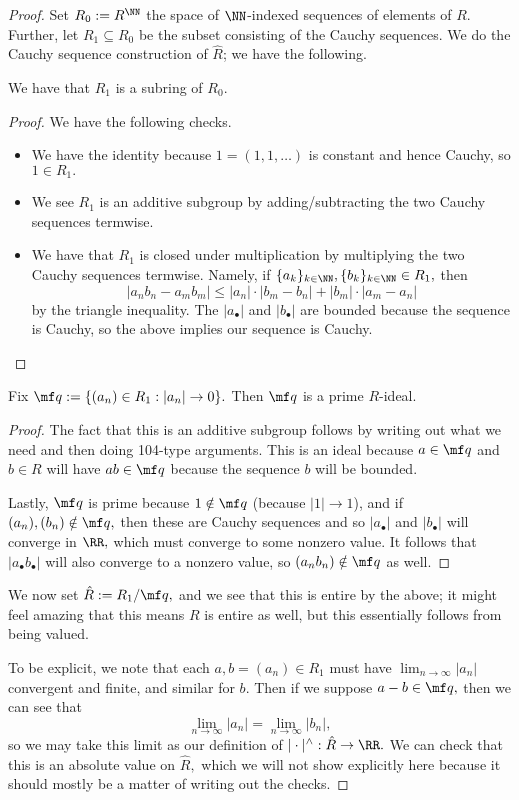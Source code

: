 \begin{proof}
	Set $R_0:=R^\NN$ the space of $\NN$-indexed sequences of elements of $R.$ Further, let $R_1\subseteq R_0$ be the subset consisting of the Cauchy sequences. We do the Cauchy sequence construction of $\hat R$; we have the following.
	\begin{lemma}
		We have that $R_1$ is a subring of $R_0.$
	\end{lemma}
	\begin{proof}
		We have the following checks.
		\begin{itemize}
			\item We have the identity because $1=(1,1,\ldots)$ is constant and hence Cauchy, so $1\in R_1.$
			\item We see $R_1$ is an additive subgroup by adding/subtracting the two Cauchy sequences termwise.
			\item We have that $R_1$ is closed under multiplication by multiplying the two Cauchy sequences termwise. Namely, if $\{a_k\}_{k\in\NN},\{b_k\}_{k\in\NN}\in R_1,$ then
			\[|a_nb_n-a_mb_m|\le|a_n|\cdot|b_m-b_n|+|b_m|\cdot|a_m-a_n|\]
			by the triangle inequality. The $|a_\bullet|$ and $|b_\bullet|$ are bounded because the sequence is Cauchy, so the above implies our sequence is Cauchy.
			\qedhere
		\end{itemize}
	\end{proof}
	\begin{lemma}
		Fix $\mf q:=\{(a_n)\in R_1:|a_n|\to0\}.$ Then $\mf q$ is a prime $R$-ideal.
	\end{lemma}
	\begin{proof}
		The fact that this is an additive subgroup follows by writing out what we need and then doing 104-type arguments. This is an ideal because $a\in\mf q$ and $b\in R$ will have $ab\in\mf q$ because the sequence $b$ will be bounded.
		
		Lastly, $\mf q$ is prime because $1\notin\mf q$ (because $|1|\to1$), and if $(a_n),(b_n)\notin\mf q,$ then these are Cauchy sequences and so $|a_\bullet|$ and $|b_\bullet|$ will converge in $\RR,$ which must converge to some nonzero value. It follows that $|a_\bullet b_\bullet|$ will also converge to a nonzero value, so $(a_nb_n)\notin\mf q$ as well.
	\end{proof}
	We now set $\hat R:=R_1/\mf q,$ and we see that this is entire by the above; it might feel amazing that this means $R$ is entire as well, but this essentially follows from being valued.

	To be explicit, we note that each $a,b=(a_n)\in R_1$ must have $\lim_{n\to\infty}|a_n|$ convergent and finite, and similar for $b.$ Then if we suppose $a-b\in\mf q,$ then we can see that
	\[\lim_{n\to\infty}|a_n|=\lim_{n\to\infty}|b_n|,\]
	so we may take this limit as our definition of $|\cdot|^\wedge:\hat R\to\RR.$ We can check that this is an absolute value on $\hat R,$ which we will not show explicitly here because it should mostly be a matter of writing out the checks.


\end{proof}
